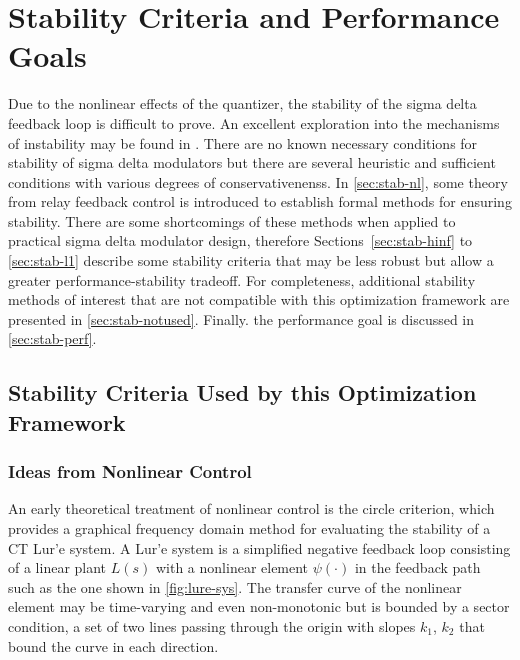 
\chapter{Stability Criteria and Performance Goals}
\label{ch:Stability}

Due to the nonlinear effects of the quantizer, the stability of the sigma delta feedback loop is difficult to prove. An excellent exploration into the mechanisms of instability may be found in \cite{Risbo1994}. There are no known necessary conditions for stability of sigma delta modulators but there are several heuristic and sufficient conditions with various degrees of conservativenenss. In \autoref{sec:stab-nl}, some theory from relay feedback control is introduced to establish formal methods for ensuring stability. There are some shortcomings of these methods when applied to practical sigma delta modulator design, therefore Sections~\ref{sec:stab-hinf} to \ref{sec:stab-l1} describe some stability criteria that may be less robust but allow a greater performance-stability tradeoff. For completeness, additional stability methods of interest that are not compatible with this optimization framework are presented in \autoref{sec:stab-notused}. Finally. the performance goal is discussed in \autoref{sec:stab-perf}.

\section{Stability Criteria Used by this Optimization Framework}
\label{sec:stab-used}

\subsection{Ideas from Nonlinear Control}
\label{sec:stab-nl}

An early theoretical treatment of nonlinear control is the circle criterion, which provides a graphical frequency domain method for evaluating the stability of a \gls{CT} Lur'e system. A Lur'e system is a simplified negative feedback loop consisting of a linear plant $L(s)$ with a nonlinear element $\psi(\cdot)$ in the feedback path such as the one shown in \autoref{fig:lure-sys}. The transfer curve of the nonlinear element may be time-varying and even non-monotonic but is bounded by a sector condition, a set of two lines passing through the origin with slopes $k_1$, $k_2$ that bound the curve in each direction.

